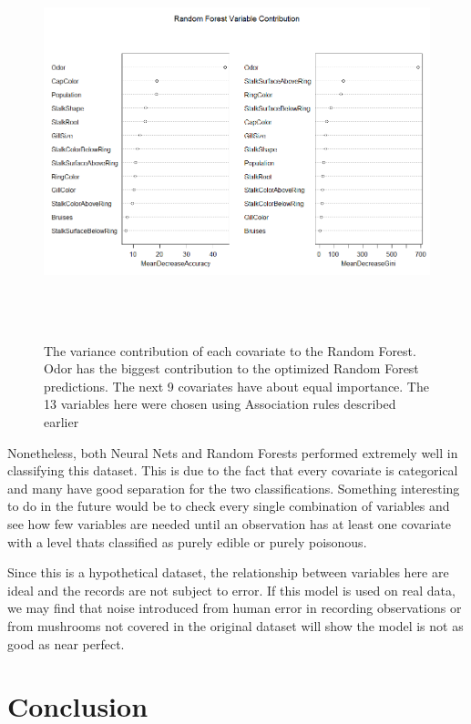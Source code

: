 \documentclass[float=false, crop=false]{standalone}
\begin{document}
\begin{figure}[H] 
		\includegraphics[width=\textwidth, height=4.5in]{images/forestvar.png}
		\caption{The variance contribution of each covariate to the Random Forest. Odor has the biggest contribution to the optimized Random Forest predictions. The next 9 covariates have about equal importance. The 13 variables here were chosen using Association rules described earlier}
		\label{fig: forestvar}
\end{figure}

Nonetheless, both Neural Nets and Random Forests performed extremely well in classifying this dataset. This is due to the fact that every covariate is categorical and many have good separation for the two classifications. Something interesting to do in the future would be to check every single combination of variables and see how few variables are needed until an observation has at least one covariate with a level thats classified as purely edible or purely poisonous. 

Since this is a hypothetical dataset, the relationship between variables here are ideal and the records are not subject to error. If this model is used on real data, we may find that noise introduced from human error in recording observations or from mushrooms not covered in the original dataset will show the model is not as good as near perfect. 

\section*{Conclusion}
\end{document}
